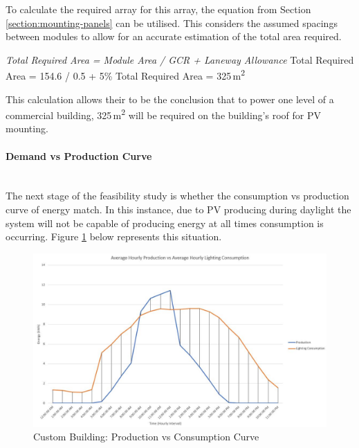 To calculate the required array for this array, the equation from Section \ref{section:mounting-panels} can be utilised. This considers the assumed spacings between modules to allow for an accurate estimation of the total area required. 

\begin{center}
	\textit{Total Required Area = Module Area / GCR + Laneway Allowance}
	\newline
	Total Required Area = 154.6 / 0.5 + 5\%
	\newline
	Total Required Area = 325\,\si{m^2}
\end{center} 

This calculation allows their to be the conclusion that to power one level of a commercial building, 325\,\si{m^2} will be required on the building's roof for PV mounting. 

\paragraph{Demand vs Production Curve}
~\\
The next stage of the feasibility study is whether the consumption vs production curve of energy match. In this instance, due to PV producing during daylight the system will not be capable of producing energy at all times consumption is occurring. Figure \ref{fig:custom-building-production-vs-consumption} below represents this situation.  

\begin{figure}[H]
	\hfill\includegraphics[width = 150mm]{images/custom-building/production-vs-consumption}\hspace*{\fill}
	\caption{Custom Building: Production vs Consumption Curve} 
	\label{fig:custom-building-production-vs-consumption}
\end{figure}  

